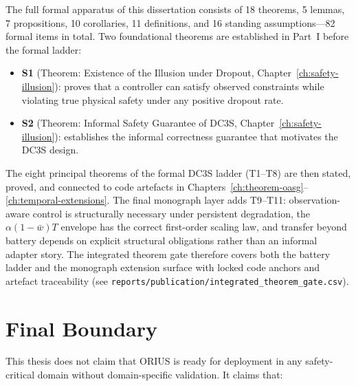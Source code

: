 The full formal apparatus of this dissertation consists of 18 theorems,
5 lemmas, 7 propositions, 10 corollaries, 11 definitions, and 16 standing
assumptions---82 formal items in total.  Two foundational theorems are
established in Part~I before the formal ladder:

\begin{itemize}
  \item \textbf{S1} (Theorem: Existence of the Illusion under Dropout,
    Chapter~\ref{ch:safety-illusion}): proves that a
    controller can satisfy observed constraints while violating true
    physical safety under any positive dropout rate.
  \item \textbf{S2} (Theorem: Informal Safety Guarantee of DC3S,
    Chapter~\ref{ch:safety-illusion}): establishes the
    informal correctness guarantee that motivates the DC3S design.
\end{itemize}

The eight principal theorems of the formal DC3S ladder (T1--T8) are then
stated, proved, and connected to code artefacts in
Chapters~\ref{ch:theorem-oasg}--\ref{ch:temporal-extensions}.  The final
monograph layer adds T9--T11: observation-aware control is structurally
necessary under persistent degradation, the $\alpha(1-\bar{w})T$ envelope has
the correct first-order scaling law, and transfer beyond battery depends on
explicit structural obligations rather than an informal adapter story.
The integrated theorem gate therefore covers both the battery ladder and the
monograph extension surface with locked code anchors and artefact traceability
(see \texttt{reports/publication/integrated\_theorem\_gate.csv}).

\section{Final Boundary}

This thesis does not claim that ORIUS is ready for deployment in any
safety-critical domain without domain-specific validation.  It claims
that:

